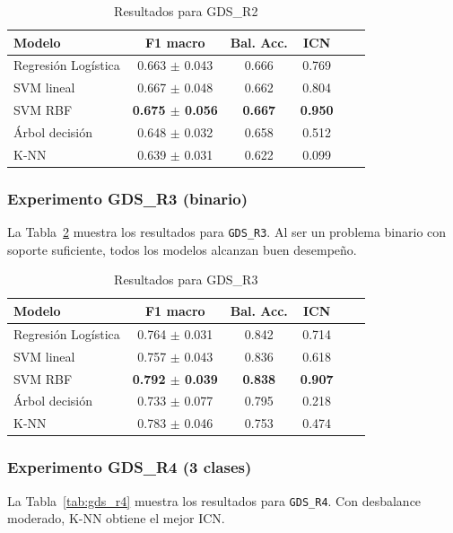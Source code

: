 \documentclass[conference]{IEEEtran}
\begin{document}
\begin{table}[h]
\centering
\caption{Resultados para GDS\_R2}
\label{tab:gds_r2}
\begin{tabular}{lccccc}
\toprule
\textbf{Modelo} & \textbf{F1 macro} & \textbf{Bal. Acc.} & \textbf{ICN} \\
\midrule
Regresión Logística & 0.663 $\pm$ 0.043 & 0.666 & 0.769 \\
SVM lineal & 0.667 $\pm$ 0.048 & 0.662 & 0.804 \\
SVM RBF & \textbf{0.675 $\pm$ 0.056} & \textbf{0.667} & \textbf{0.950} \\
Árbol decisión & 0.648 $\pm$ 0.032 & 0.658 & 0.512 \\
K-NN & 0.639 $\pm$ 0.031 & 0.622 & 0.099 \\
\bottomrule
\end{tabular}
\end{table}

\subsubsection*{Experimento GDS\_R3 (binario)}
La Tabla~\ref{tab:gds_r3} muestra los resultados para \texttt{GDS\_R3}. Al ser un problema binario con soporte suficiente, todos los modelos alcanzan buen desempeño.

\begin{table}[h]
\centering
\caption{Resultados para GDS\_R3}
\label{tab:gds_r3}
\begin{tabular}{lccccc}
\toprule
\textbf{Modelo} & \textbf{F1 macro} & \textbf{Bal. Acc.} & \textbf{ICN} \\
\midrule
Regresión Logística & 0.764 $\pm$ 0.031 & 0.842 & 0.714 \\
SVM lineal & 0.757 $\pm$ 0.043 & 0.836 & 0.618 \\
SVM RBF & \textbf{0.792 $\pm$ 0.039} & \textbf{0.838} & \textbf{0.907} \\
Árbol decisión & 0.733 $\pm$ 0.077 & 0.795 & 0.218 \\
K-NN & 0.783 $\pm$ 0.046 & 0.753 & 0.474 \\
\bottomrule
\end{tabular}
\end{table}

\subsubsection*{Experimento GDS\_R4 (3 clases)}
La Tabla~\ref{tab:gds_r4} muestra los resultados para \texttt{GDS\_R4}. Con desbalance moderado, K-NN obtiene el mejor ICN.
\end{document}
